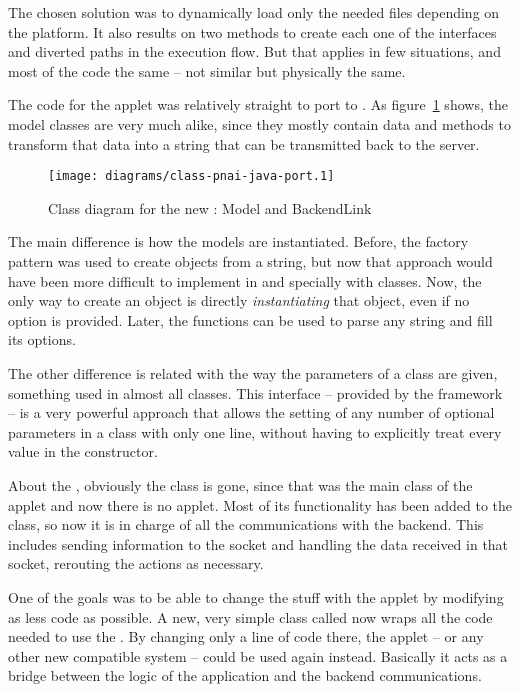 The chosen solution was to dynamically load only the needed  files depending on the platform.
It also results on two methods to create each one of the interfaces and diverted paths in the execution flow.
But that applies in few situations, and most of the code the same -- not similar but physically the same.

The  code for the applet was relatively straight to port to .
As figure~\ref{fig:class-pnai-java-port} shows, the model classes are very much alike, since they mostly contain data and methods to transform that data into a string that can be transmitted back to the server.

\begin{figure}[htbp]
  \centering
    \texttt{[image: diagrams/class-pnai-java-port.1]}
  \caption{Class diagram for the new : Model and BackendLink}
  \label{fig:class-pnai-java-port}
\end{figure}

The main difference is how the models are instantiated.
Before, the factory pattern was used to create objects from a string, but now that approach would have been more difficult to implement in  and specially with  classes.
Now, the only way to create an object is directly \emph{instantiating} that object, even if no option is provided.
Later, the  functions can be used to parse any string and fill its options.

The other difference is related with the way the parameters of a class are given, something used in almost all classes.
This  interface -- provided by the  framework -- is a very powerful approach that allows the setting of any number of optional parameters in a class with only one line, without having to explicitly treat every value in the constructor.

About the , obviously the  class is gone, since that was the main class of the applet and now there is no applet.
Most of its functionality has been added to the  class, so now it is in charge of all the communications with the backend.
This includes sending information to the  socket and handling the data received in that socket, rerouting the actions as necessary.

One of the goals was to be able to change the  stuff with the applet by modifying as less code as possible.
A new, very simple class called  now wraps all the code needed to use the .
By changing only a line of code there, the applet -- or any other new compatible system -- could be used again instead.
Basically it acts as a bridge between the logic of the application and the backend communications.

